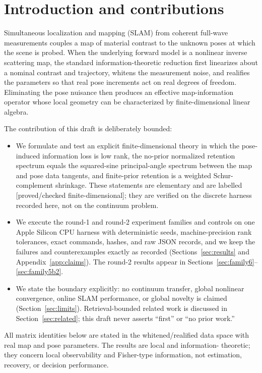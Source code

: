 \documentclass[12pt]{article}
\newcommand{\FDL}{\textnormal{[proved/checked finite-dimensional]}}
\begin{document}
\section{Introduction and contributions}\label{sec:intro}

Simultaneous localization and mapping (SLAM) from coherent full-wave
measurements couples a map of material contrast to the unknown poses at which
the scene is probed. When the underlying forward model is a nonlinear inverse
scattering map, the standard information-theoretic reduction first linearizes
about a nominal contrast and trajectory, whitens the measurement noise, and
realifies the parameters so that real pose increments act on real degrees of
freedom. Eliminating the pose nuisance then produces an effective
map-information operator whose local geometry can be characterized by
finite-dimensional linear algebra.

The contribution of this draft is deliberately bounded:
\begin{itemize}
\item We formulate and test an explicit finite-dimensional theory in which
the pose-induced information loss is low rank, the no-prior normalized
retention spectrum equals the squared-sine principal-angle spectrum between
the map and pose data tangents, and finite-prior retention is a weighted
Schur-complement shrinkage. These statements are elementary and are labelled
\FDL{}; they are verified on the discrete harness recorded here, not on the
continuum problem.
\item We execute the round-1 and round-2 experiment families and controls on
one Apple Silicon CPU harness with deterministic seeds, machine-precision rank
tolerances, exact commands, hashes, and raw JSON records, and we keep the
failures and counterexamples exactly as recorded (Sections~\ref{sec:results}
and Appendix~\ref{app:claims}). The round-2 results appear in
Sections~\ref{sec:family6}--\ref{sec:family5b2}.
\item We state the boundary explicitly: no continuum transfer, global
nonlinear convergence, online SLAM performance, or global novelty is claimed
(Section~\ref{sec:limits}). Retrieval-bounded related work is discussed in
Section~\ref{sec:related}; this draft never asserts ``first'' or ``no prior
work.''
\end{itemize}

All matrix identities below are stated in the whitened/realified data space
with real map and pose parameters. The results are local and information-
theoretic; they concern local observability and Fisher-type information, not
estimation, recovery, or decision performance.
\end{document}
